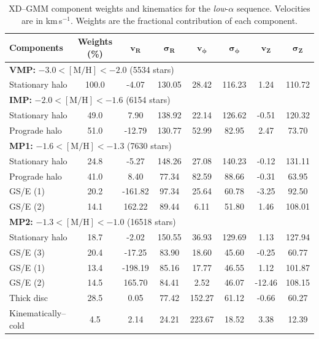 \documentclass[a4paper,12pt]{article}
\begin{document}
\begin{table}[H]
\centering
\begin{tabular}{lccccccc}
\hline
\textbf{Components} & \textbf{Weights (\%)} & $\mathbf{v_R}$ & $\boldsymbol{\sigma_R}$ & $\mathbf{v_\phi}$ & $\boldsymbol{\sigma_\phi}$ & $\mathbf{v_Z}$ & $\boldsymbol{\sigma_Z}$ \\
\hline
\multicolumn{8}{l}{\textbf{VMP:} $-3.0 < \mathrm{[M/H]} < -2.0$ (5534 stars)} \\
Stationary halo      & 100.0 &  -4.07 & 130.05 &  28.42 & 116.23 &  1.24 & 110.72 \\
\hline
\multicolumn{8}{l}{\textbf{IMP:} $-2.0 < \mathrm{[M/H]} < -1.6$ (6154 stars)} \\
Stationary halo      & 49.0  &   7.90 & 138.92 &  22.14 & 126.62 & -0.51 & 120.32 \\
Prograde halo        & 51.0  & -12.79 & 130.77 &  52.99 &  82.95 &  2.47 &  73.70 \\
\hline
\multicolumn{8}{l}{\textbf{MP1:} $-1.6 < \mathrm{[M/H]} < -1.3$ (7630 stars)} \\
Stationary halo      & 24.8  &  -5.27 & 148.26 &  27.08 & 140.23 & -0.12 & 131.11 \\
Prograde halo        & 41.0  &   8.40 &  77.34 &  82.59 &  88.66 & -0.31 &  63.95 \\
GS/E (1)             & 20.2  &-161.82 &  97.34 &  25.64 &  60.78 & -3.25 &  92.50 \\
GS/E (2)             & 14.1  & 162.22 &  89.44 &   6.11 &  51.80 &  1.46 & 108.01 \\
\hline
\multicolumn{8}{l}{\textbf{MP2:} $-1.3 < \mathrm{[M/H]} < -1.0$ (16518 stars)} \\
Stationary halo      & 18.7  &  -2.02 & 150.55 &  36.93 & 129.69 &   1.13 & 127.94 \\
GS/E (3)             & 20.4  & -17.25 &  83.90 &  18.60 &  45.60 &  -0.25 &  60.77 \\
GS/E (1)             & 13.4  &-198.19 &  85.16 &  17.77 &  46.55 &   1.12 & 101.87 \\
GS/E (2)             & 14.5  & 165.70 &  84.41 &   2.52 &  46.07 & -12.46 & 108.15 \\
Thick disc           & 28.5  &   0.05 &  77.42 & 152.27 &  61.12 &  -0.66 &  60.27 \\
Kinematically–cold   &  4.5  &   2.14 &  24.21 & 223.67 &  18.52 &   3.38 &  12.39 \\
\hline
\end{tabular}
\caption{XD--GMM component weights and kinematics for the \emph{low}-$\alpha$ sequence.  
         Velocities are in km\,s$^{-1}$. Weights are the fractional contribution of each component.}
\label{tab:gmm_lowa_stats}
\end{table}
\end{document}
